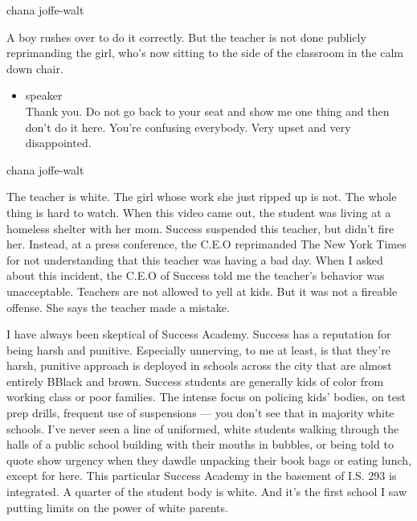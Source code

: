 chana joffe-walt

A boy rushes over to do it correctly. But the teacher is not done
publicly reprimanding the girl, who's now sitting to the side of the
classroom in the calm down chair.

\begin{itemize}
\tightlist
\item
  speaker\\
  Thank you. Do not go back to your seat and show me one thing and then
  don't do it here. You're confusing everybody. Very upset and very
  disappointed.
\end{itemize}

chana joffe-walt

The teacher is white. The girl whose work she just ripped up is not. The
whole thing is hard to watch. When this video came out, the student was
living at a homeless shelter with her mom. Success suspended this
teacher, but didn't fire her. Instead, at a press conference, the C.E.O
reprimanded The New York Times for not understanding that this teacher
was having a bad day. When I asked about this incident, the C.E.O of
Success told me the teacher's behavior was unacceptable. Teachers are
not allowed to yell at kids. But it was not a fireable offense. She says
the teacher made a mistake.

I have always been skeptical of Success Academy. Success has a
reputation for being harsh and punitive. Especially unnerving, to me at
least, is that they're harsh, punitive approach is deployed in schools
across the city that are almost entirely BBlack and brown. Success
students are generally kids of color from working class or poor
families. The intense focus on policing kids' bodies, on test prep
drills, frequent use of suspensions --- you don't see that in majority
white schools. I've never seen a line of uniformed, white students
walking through the halls of a public school building with their mouths
in bubbles, or being told to quote show urgency when they dawdle
unpacking their book bags or eating lunch, except for here. This
particular Success Academy in the basement of I.S. 293 is integrated. A
quarter of the student body is white. And it's the first school I saw
putting limits on the power of white parents.


